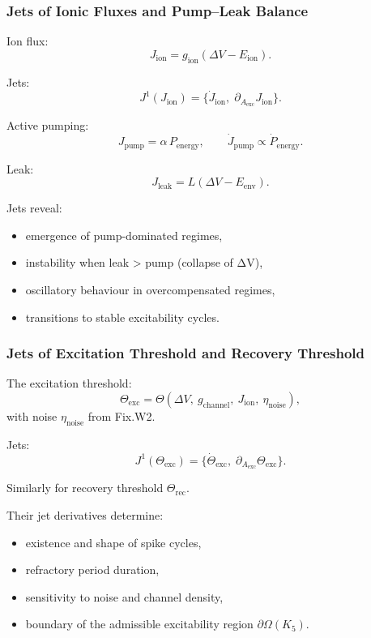 \subsubsection{Jets of Ionic Fluxes and Pump–Leak Balance}

Ion flux:
\[
J_{\mathrm{ion}} = g_{\mathrm{ion}}(\Delta V - E_{\mathrm{ion}}).
\]

Jets:
\[
J^1(J_{\mathrm{ion}})=
\{\dot{J}_{\mathrm{ion}},\;
\partial_{A_{\mathrm{exc}}}J_{\mathrm{ion}}\}.
\]

Active pumping:
\[
J_{\mathrm{pump}}=\alpha\,P_{\mathrm{energy}},
\qquad \dot{J}_{\mathrm{pump}} \propto \dot{P}_{\mathrm{energy}}.
\]

Leak:
\[
J_{\mathrm{leak}} = L(\Delta V - E_{\mathrm{env}}).
\]

Jets reveal:

\begin{itemize}
    \item emergence of pump-dominated regimes,
    \item instability when leak > pump (collapse of ΔV),
    \item oscillatory behaviour in overcompensated regimes,
    \item transitions to stable excitability cycles.
\end{itemize}


\subsubsection{Jets of Excitation Threshold and Recovery Threshold}

The excitation threshold:
\[
\Theta_{\mathrm{exc}}=
\Theta(\Delta V,\ g_{\mathrm{channel}},\ J_{\mathrm{ion}},\ \eta_{\mathrm{noise}}),
\]
with noise $\eta_{\mathrm{noise}}$ from Fix.W2.

Jets:
\[
J^1(\Theta_{\mathrm{exc}})=
\{\dot{\Theta}_{\mathrm{exc}},\;
\partial_{A_{\mathrm{exc}}}\Theta_{\mathrm{exc}}\}.
\]

Similarly for recovery threshold $\Theta_{\mathrm{rec}}$.

Their jet derivatives determine:

\begin{itemize}
    \item existence and shape of spike cycles,
    \item refractory period duration,
    \item sensitivity to noise and channel density,
    \item boundary of the admissible excitability region $\partial\Omega(K_5)$.
\end{itemize}


